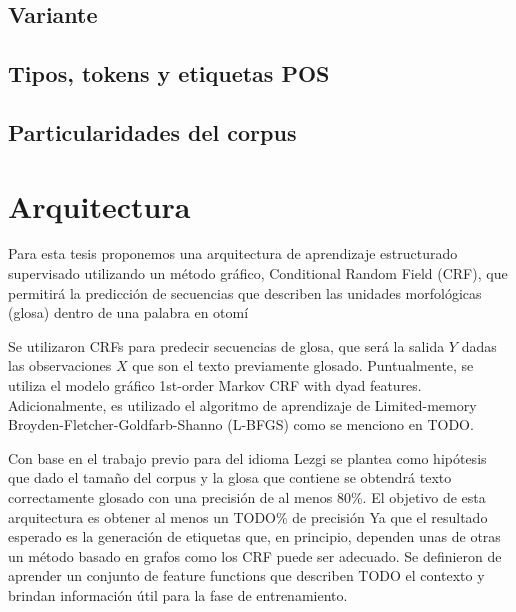 \documentclass[letterpaper,12pt,oneside]{book}
\begin{document}


\subsection{Variante}


\subsection{Tipos, tokens y etiquetas POS}


\subsection{Particularidades del corpus}


\section{Arquitectura}

Para esta tesis proponemos una arquitectura de aprendizaje
estructurado  supervisado utilizando un método gráfico, Conditional
Random Field (CRF), que permitirá la predicción de secuencias que describen
las unidades morfológicas (glosa) dentro de una palabra en otomí

Se utilizaron CRFs para predecir secuencias de glosa, que será la salida $Y$
dadas las observaciones $X$ que son el texto previamente glosado. Puntualmente,
se utiliza el modelo gráfico 1st-order Markov CRF with dyad features.
Adicionalmente, es utilizado el algoritmo de aprendizaje de Limited-memory
Broyden-Fletcher-Goldfarb-Shanno (L-BFGS) como se menciono en TODO.

Con base en el trabajo previo para del idioma Lezgi \citep{moeller2018automatic} se plantea como hipótesis que dado el tamaño del corpus y la glosa que contiene
se obtendrá texto correctamente glosado con una precisión de al menos 80\%. El objetivo de esta arquitectura es obtener al menos un TODO\% de precisión
Ya que el resultado esperado es la generación de etiquetas que, en principio,
dependen unas de otras un método basado en grafos como los CRF puede ser
adecuado. Se definieron de aprender un conjunto de feature functions que
describen TODO el contexto y brindan información útil para la fase de
entrenamiento.
\end{document}
